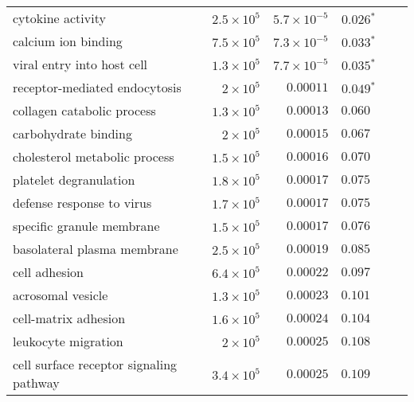 \begin{longtable}{|l|r|r|r|r|r|}
    cytokine activity                        & $2.5\times 10^{5}$ & $5.7\times 10^{-5}$  & $\bm{ 0.026{^*}}$               \\
    calcium ion binding                      & $7.5\times 10^{5}$ & $7.3\times 10^{-5}$  & $\bm{ 0.033{^*}}$               \\
    viral entry into host cell               & $1.3\times 10^{5}$ & $7.7\times 10^{-5}$  & $\bm{ 0.035{^*}}$               \\
    receptor-mediated endocytosis            & $ 2\times 10^{5}$  & $0.00011$            & $\bm{ 0.049{^*}}$               \\
    collagen catabolic process               & $1.3\times 10^{5}$ & $0.00013$            & $ 0.060~~$                      \\
    carbohydrate binding                     & $ 2\times 10^{5}$  & $0.00015$            & $ 0.067~~$                      \\
    cholesterol metabolic process            & $1.5\times 10^{5}$ & $0.00016$            & $ 0.070~~$                      \\
    platelet degranulation                   & $1.8\times 10^{5}$ & $0.00017$            & $ 0.075~~$                      \\
    defense response to virus                & $1.7\times 10^{5}$ & $0.00017$            & $ 0.075~~$                      \\
    specific granule membrane                & $1.5\times 10^{5}$ & $0.00017$            & $ 0.076~~$                      \\
    basolateral plasma membrane              & $2.5\times 10^{5}$ & $0.00019$            & $ 0.085~~$                      \\
    cell adhesion                            & $6.4\times 10^{5}$ & $0.00022$            & $ 0.097~~$                      \\
    acrosomal vesicle                        & $1.3\times 10^{5}$ & $0.00023$            & $ 0.101~~$                      \\
    cell-matrix adhesion                     & $1.6\times 10^{5}$ & $0.00024$            & $ 0.104~~$                      \\
    leukocyte migration                      & $ 2\times 10^{5}$  & $0.00025$            & $ 0.108~~$                      \\
    cell surface receptor signaling pathway  & $3.4\times 10^{5}$ & $0.00025$            & $ 0.109~~$                      \\

\end{longtable}
